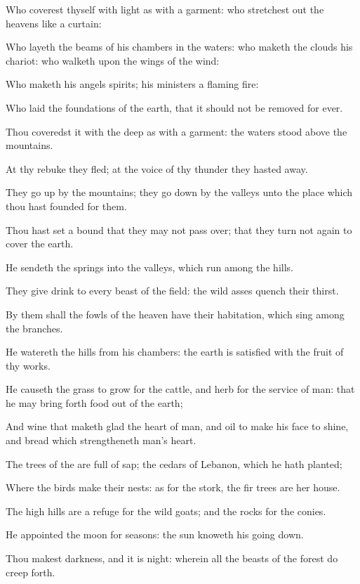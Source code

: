 \verse Who coverest thyself with light as with a garment: who stretchest out the heavens like a curtain:

\verse Who layeth the beams of his chambers in the waters: who maketh the clouds his chariot: who walketh upon the wings of the wind:

\verse Who maketh his angels spirits; his ministers a flaming fire:

\verse Who laid the foundations of the earth, that it should not be removed for ever.

\verse Thou coveredst it with the deep as with a garment: the waters stood above the mountains.

\verse At thy rebuke they fled; at the voice of thy thunder they hasted away.

\verse They go up by the mountains; they go down by the valleys unto the place which thou hast founded for them.

\verse Thou hast set a bound that they may not pass over; that they turn not again to cover the earth.

\verse He sendeth the springs into the valleys, which run among the hills.

\verse They give drink to every beast of the field: the wild asses quench their thirst.

\verse By them shall the fowls of the heaven have their habitation, which sing among the branches.

\verse He watereth the hills from his chambers: the earth is satisfied with the fruit of thy works.

\verse He causeth the grass to grow for the cattle, and herb for the service of man: that he may bring forth food out of the earth;

\verse And wine that maketh glad the heart of man, and oil to make his face to shine, and bread which strengtheneth man's heart.

\verse The trees of the \LORD are full of sap; the cedars of Lebanon, which he hath planted;

\verse Where the birds make their nests: as for the stork, the fir trees are her house.

\verse The high hills are a refuge for the wild goats; and the rocks for the conies.

\verse He appointed the moon for seasons: the sun knoweth his going down.

\verse Thou makest darkness, and it is night: wherein all the beasts of the forest do creep forth.

